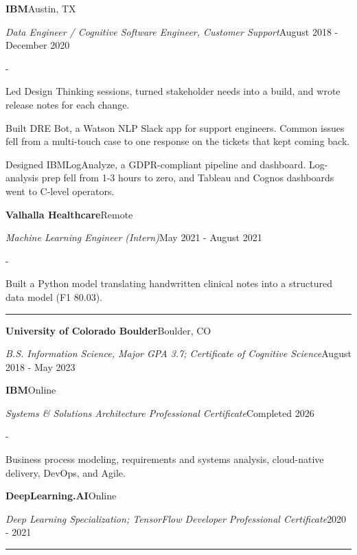 \documentclass[10pt,letterpaper]{article}
\newenvironment{cvitems}{%
  \begin{list}{-}{%
    \setlength{\leftmargin}{12pt}%
    \setlength{\itemsep}{1.2pt}%
    \setlength{\parsep}{0pt}%
    \setlength{\topsep}{1.5pt}%
    \setlength{\partopsep}{0pt}%
    \setlength{\labelwidth}{6pt}%
    \setlength{\labelsep}{6pt}%
    \setlength{\itemindent}{0pt}%
  }%
}{\end{list}}
\newcommand{\cvsection}[1]{%
  \vspace{7pt}%
  \noindent{\bfseries\fontsize{11pt}{13pt}\selectfont\MakeUppercase{#1}}\par
  \vspace{1pt}%
  \noindent\rule{\textwidth}{0.4pt}\par
  \vspace{4pt}%
}
\newcommand{\cventryhead}[4]{%
  \noindent\textbf{#1}\hfill#2\par
  \vspace{0.5pt}%
  \noindent\textit{#3}\hfill#4\par
}
\newcommand{\cveduhead}[4]{%
  \noindent\textbf{#1}\hfill#2\par
  \vspace{0.5pt}%
  \noindent\textit{#3}\hfill#4\par
}
\begin{document}
\vspace{3pt}
\cventryhead{IBM}{Austin, TX}
{Data Engineer / Cognitive Software Engineer, Customer Support}{August 2018 - December 2020}
\begin{cvitems}
  \item Led Design Thinking sessions, turned stakeholder needs into a build, and wrote release notes for each change.
  \item Built DRE Bot, a Watson NLP Slack app for support engineers. Common issues fell from a multi-touch case to one response on the tickets that kept coming back.
  \item Designed IBMLogAnalyze, a GDPR-compliant pipeline and dashboard. Log-analysis prep fell from 1-3 hours to zero, and Tableau and Cognos dashboards went to C-level operators.
\end{cvitems}

\vspace{3pt}
\cventryhead{Valhalla Healthcare}{Remote}
{Machine Learning Engineer (Intern)}{May 2021 - August 2021}
\begin{cvitems}
  \item Built a Python model translating handwritten clinical notes into a structured data model (F1 80.03).
\end{cvitems}

\cvsection{Education}

\cveduhead{University of Colorado Boulder}{Boulder, CO}
{B.S. Information Science, Major GPA 3.7; Certificate of Cognitive Science}{August 2018 - May 2023}

\vspace{3pt}
\cveduhead{IBM}{Online}
{Systems \& Solutions Architecture Professional Certificate}{Completed 2026}
\begin{cvitems}
  \item Business process modeling, requirements and systems analysis, cloud-native delivery, DevOps, and Agile.

\vspace{3pt}
\cveduhead{DeepLearning.AI}{Online}
{Deep Learning Specialization; TensorFlow Developer Professional Certificate}{2020 - 2021}
\end{cvitems}

\cvsection{Skills}
\end{document}
